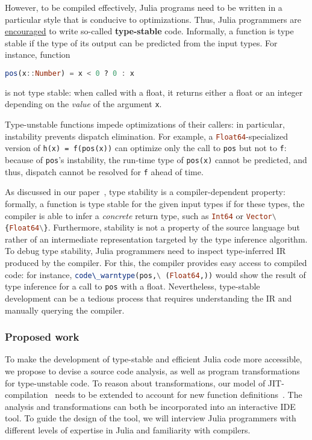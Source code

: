 \documentclass[twocolumn]{article}
\newcommand{\jlc}[1]{\lstinline[language=Julia]|#1|\xspace}
\begin{document}
However, to be compiled effectively,
Julia programs need to be written in a particular style
that is conducive to optimizations. Thus, %
Julia programmers are
\href{https://docs.julialang.org/en/v1/manual/performance-tips/#Write-%22type-stable%22-functions}{encouraged}
to write so-called \textbf{type-stable} code. Informally, a
function is type stable if the type of its output can be predicted from
the input types. For instance, function
\begin{lstlisting}[language=Julia]
pos(x::Number) = x < 0 ? 0 : x
\end{lstlisting}
is not type stable: when called with a float, it returns either a float or an
integer depending on the \emph{value} of the argument \texttt{x}.

Type-unstable functions impede optimizations of their callers: in
particular, instability prevents dispatch elimination. For example, a
\jlc{Float64}-specialized version of \texttt{h(x)\ =\ f(pos(x))} can
optimize only the call to \texttt{pos} but not to \texttt{f}: because of
\texttt{pos}'s instability, the run-time type of \texttt{pos(x)} cannot
be predicted, and thus, dispatch cannot be resolved for \texttt{f} ahead
of time.

As discussed in our paper~\cite{stability},
type stability is a compiler-dependent
property: formally, a function is type stable for the given input types
if for these types, the compiler is able to infer a \emph{concrete}
return type, such as \jlc{Int64} or \jlc{Vector\{Float64\}}.
Furthermore, stability is not a property of the source language but
rather of an intermediate representation targeted by the type inference
algorithm. To debug type stability, Julia programmers need to inspect
type-inferred IR produced by the compiler. For this, the compiler
provides easy access to compiled code: for instance,
\jlc{code\_warntype(pos,\ (Float64,))} would show the result of type
inference for a call to \texttt{pos} with a float. Nevertheless,
type-stable development can be a tedious process that requires
understanding the IR and manually querying the compiler.

\subsubsection*{Proposed work}\label{proposed-work}

To make the development of type-stable and efficient Julia code more
accessible, we propose to devise a source code analysis, as well as
program transformations for type-unstable code.
To reason about transformations, our model of JIT-compilation~\cite{stability}
needs to be extended to account for new function definitions~\cite{worldage}.
The analysis and
transformations can both be incorporated into an interactive IDE tool.
To guide the design of the tool, we will interview Julia programmers
with different levels of expertise in Julia and familiarity with
compilers.
\end{document}
